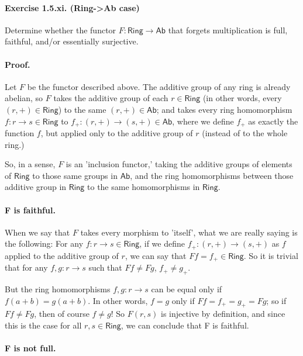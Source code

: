 \documentclass[main.tex]{subfiles}
\begin{document}
\paragraph{Exercise 1.5.xi. (Ring->Ab case)} Determine whether the functor \(F \colon \textsf{Ring} \to \textsf{Ab}\) that forgets multiplication is full, faithful, and/or essentially surjective.

\paragraph{Proof.} Let \(F\) be the functor described above. The additive group of any ring is already abelian, so \(F\)  takes the additive group of each \(r \in \textsf{Ring}\) (in other words, every \((r, +) \in \textsf{Ring}\)) to the same \((r, +) \in \textsf{Ab}\); and takes every ring homomorphism \(f \colon r \to s \in \textsf{Ring}\) to \(f_+ \colon (r, +) \to (s, +) \in \textsf{Ab}\),  where we define \(f_+\) as exactly the function \(f\), but applied only to the additive group of \(r\) (instead of to the whole ring.) 

So, in a sense, \(F\) is an 'inclusion functor,' taking the additive groups of elements of \(\textsf{Ring}\) to those same groups in \(\textsf{Ab}\), and the ring homomorphisms between those additive group in \(\textsf{Ring}\) to the same homomorphisms in \(\textsf{Ring}\).

\paragraph{F is faithful.}	

When we say that \(F\) takes every morphism to 'itself', what we are really saying is the following: For any \(f \colon r \to s \in \textsf{Ring}\), if we define \(f_+ \colon (r, +) \to (s, +)\) as \(f\) applied to the additive group of \(r\), we can say that \(Ff = f_+\in \textsf{Ring}\). So it is trivial that for any \(f, g \colon r \to s\) such that \(Ff \neq Fg\), \(f_+ \neq g_+\). 

But the ring homomorphisms \(f, g \colon r \to s\) can be equal only if \(f(a+b) = g(a+b)\). In other words, \(f = g \) only if \(Ff = f_+ = g_+ = Fg\); so if \(Ff \neq Fg\), then of course \(f \neq g \)! So \(F(r, s)\) is injective by definition, and since this is the case for all \(r, s \in \textsf{Ring}\), we can conclude that F is faithful.

\paragraph{F is not full.}	
\end{document}
